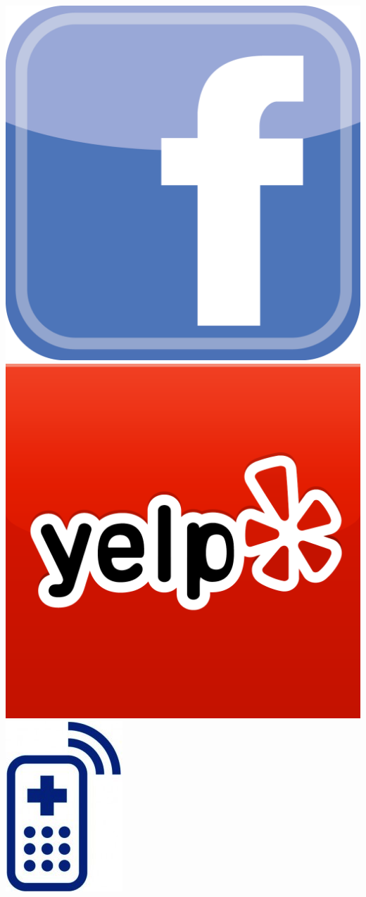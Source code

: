 \documentclass[a2,landscape]{a0poster}
\begin{document}
\begin{itemize}
	\includegraphics[scale=0.3]{plots/logo_facebook}
	\includegraphics[scale=0.08]{plots/logo_yelp}
	\includegraphics[scale=0.4]{plots/logo_mhealth}\\

\end{itemize}
\end{document}
